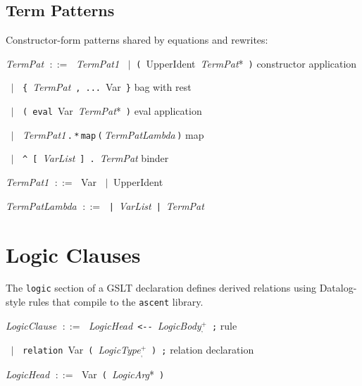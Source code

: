 \documentclass[11pt,a4paper]{article}
\newcommand{\kw}[1]{\texttt{\textcolor{kw}{#1}}}       %
\newcommand{\sym}[1]{\texttt{#1}}                       %
\newcommand{\nt}[1]{\textit{\textcolor{nt}{#1}}}        %
\newcommand{\tok}[1]{\textsf{#1}}                       %
\newcommand{\OR}{\ensuremath{\;\mid\;}}                  %
\newcommand{\bnfdef}{\ensuremath{\;::=\;}}               %
\newenvironment{grammar}{%
  \par\smallskip\begin{list}{}{%
    \setlength{\leftmargin}{1.5em}%
    \setlength{\itemsep}{2pt}%
    \setlength{\parsep}{0pt}}%
}{\end{list}\smallskip}
\begin{document}
\subsection{Term Patterns}

Constructor-form patterns shared by equations and rewrites:

\begin{grammar}
\item \nt{TermPat} \bnfdef
    \nt{TermPat1}
    \OR \sym{(}~\tok{UpperIdent}~\nt{TermPat}*~\sym{)}
    \hfill\textcolor{cmt}{constructor application}
\item \phantom{\nt{TermPat}} \OR
    \sym{\{}~\nt{TermPat}~\sym{,}~\sym{...}~\tok{Var}~\sym{\}}
    \hfill\textcolor{cmt}{bag with rest}
\item \phantom{\nt{TermPat}} \OR
    \sym{(}~\kw{eval}~\tok{Var}~\nt{TermPat}*~\sym{)}
    \hfill\textcolor{cmt}{eval application}
\item \phantom{\nt{TermPat}} \OR
    \nt{TermPat1}\,\sym{.}\,\sym{*}\,\kw{map}\,\sym{(}\,\nt{TermPatLambda}\,\sym{)}
    \hfill\textcolor{cmt}{map}
\item \phantom{\nt{TermPat}} \OR
    \sym{\^{}}~\sym{[}~\nt{VarList}~\sym{]}~\sym{.}~\nt{TermPat}
    \hfill\textcolor{cmt}{binder}
\item \nt{TermPat1} \bnfdef
    \tok{Var} \OR \tok{UpperIdent}
\item \nt{TermPatLambda} \bnfdef
    \sym{|}~\nt{VarList}~\sym{|}~\nt{TermPat}
\end{grammar}


\section{Logic Clauses}
\label{sec:logic}

The \kw{logic} section of a GSLT declaration defines derived relations
using Datalog-style rules that compile to the \texttt{ascent} library.

\begin{grammar}
\item \nt{LogicClause} \bnfdef
    \nt{LogicHead}~\sym{<-{}-}~\nt{LogicBody}$^+_{\texttt{,}}$~\sym{;}
    \hfill\textcolor{cmt}{rule}
\item \phantom{\nt{LogicClause}} \OR
    \kw{relation}~\tok{Var}~\sym{(}~\nt{LogicType}$^+_{\texttt{,}}$~\sym{)}~\sym{;}
    \hfill\textcolor{cmt}{relation declaration}
\item \nt{LogicHead} \bnfdef
    \tok{Var}~\sym{(}~\nt{LogicArg}*~\sym{)}
\end{grammar}
\end{document}
